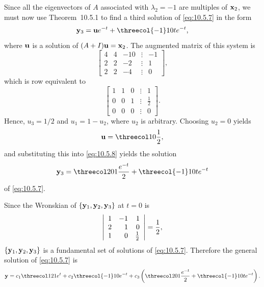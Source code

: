 \begin{examplesolution}
Since all the eigenvectors of $A$ associated with $\lambda_{2}=-1$ are multiples of ${\bf x}_{2}$,
we must now use Theorem~10.5.1 to find a third solution of \eqref{eq:10.5.7} in the
form
\begin{equation}
  \label{eq:10.5.8}{\bf y}_{3}={\bf u}e^{-t}+\threecol{-1}10te^{-t},
\end{equation}
where ${\bf u}$ is a solution of $(A+I){\bf u}={\bf x}_{2}$. The augmented matrix of this system is
\[
  \left[
  \begin{array}{rrrcr}
    4 & 4 & -10 & \vdots & -1 \\
    2 & 2 & -2  & \vdots & 1  \\
    2 & 2 & -4  & \vdots & 0
  \end{array}\right],
\]
which is row equivalent to
\[
  \left[
  \begin{array}{rrrcr}
    1 & 1 & 0 & \vdots & 1           \\
    0 & 0 & 1 & \vdots & \frac{1}{2} \\
    0 & 0 & 0 & \vdots & 0
  \end{array}\right].
\]
Hence, $u_{3}=1/2$ and $u_{1}=1-u_{2}$, where $u_{2}$ is arbitrary. Choosing $u_{2}=0$ yields
\[
  {\bf u}=\threecol10{\frac{1}{2}},
\]
and substituting this into \eqref{eq:10.5.8} yields the solution
\[
  {\bf y}_{3}=\threecol201{\frac{e^{-t}}{2}}+\threecol{-1}10te^{-t}
\]
of \eqref{eq:10.5.7}.

Since the Wronskian of $\{{\bf y}_{1},{\bf y}_{2},{\bf y}_{3}\}$ at $t=0$ is
\[
  \left|
  \begin{array}{rrr}
    1 & -1 & 1       \\
    2 & 1  & 0       \\
    1 & 0  & 1\over2
  \end{array}\right|=\frac{1}{2},
\]
$\{{\bf y}_{1},{\bf y}_{2},{\bf y}_{3}\}$ is a fundamental set of solutions of \eqref{eq:10.5.7}.
Therefore the general solution of \eqref{eq:10.5.7} is
\[
  {\bf y}=c_{1}\threecol121e^{t}+c_{2}\threecol{-1}10e^{-t}+c_{3}\left (\threecol201{\frac{e^{-t}}{2}}+\threecol{-1}10te^{-t}\right).
\]
\end{examplesolution}

